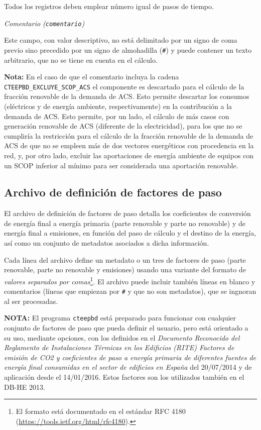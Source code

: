 \documentclass[10pt,notitlepage,oneside,a4paper]{article}
\begin{document}
Todos los registros deben emplear número igual de pasos de tiempo.

\textit{Comentario (\texttt{comentario})}

Este campo, con valor descriptivo, no está delimitado por un signo de coma previo sino precedido por un signo de almohadilla (\texttt{\#}) y puede contener un texto arbitrario, que no se tiene en cuenta en el cálculo.

\begin{myquote}\small
\textbf{Nota:} En el caso de que el comentario incluya la cadena \texttt{CTEEPBD\_EXCLUYE\_SCOP\_ACS} el componente es descartado para el cálculo de la fracción renovable de la demanda de ACS. Esto permite descartar los consumos (eléctricos y de energía ambiente, respectivamente) en la contribución a la demanda de ACS. Esto permite, por un lado, el cálculo de más casos con generación renovable de ACS (diferente de la electricidad), para los que no se cumpliría la restricción para el cálculo de la fracción renovable de la demanda de ACS de que no se empleen más de dos vectores energéticos con procedencia en la red, y, por otro lado, excluir las aportaciones de energía ambiente de equipos con un SCOP inferior al mínimo para ser considerada una aportación renovable.
\end{myquote}


\clearpage
\newpage
\subsection{Archivo de definición de factores de paso}\label{sec:formatofactorespaso}

El archivo de definición de factores de paso detalla los coeficientes de conversión de energía final a energía primaria (parte renovable  y parte no renovable) y de energía final a emisiones, en función del paso de cálculo y el destino de la energía, así como un conjunto de metadatos asociados a dicha información.

Cada línea del archivo define un metadato o un tres de factores de paso (parte renovable, parte no renovable y emisiones) usando una variante del formato de \textit{valores separados por comas}\footnote{El formato está documentado en el estándar RFC 4180 (\url{https://tools.ietf.org/html/rfc4180}).}. El archivo puede incluir también líneas en blanco y comentarios (líneas que empiezan por \texttt{\#} y que no son metadatos), que se ingnoran al ser procesadas.

\begin{myquote}\small
\textbf{NOTA:} El programa \texttt{cteepbd} está preparado para funcionar con cualquier conjunto de factores de paso que pueda definir el usuario, pero está orientado a su uso, mediante opciones, con los definidos en el \textit{Documento Reconocido del Reglamento de Instalaciones Térmicas en los Edificios (RITE) Factores de emisión de CO2 y coeficientes de paso a energía primaria de diferentes fuentes de energía final consumidas en el sector de edificios en España} del 20/07/2014 y de aplicación desde el 14/01/2016. Estos factores son los utilizados también en el DB-HE 2013.
\end{myquote}
\end{document}
